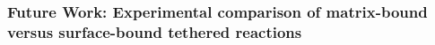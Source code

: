 \documentclass[../../AdvancementSummary.tex]{subfiles}
\begin{document}
%
%


%


\subsubsection{Future Work: Experimental comparison of matrix-bound versus surface-bound tethered reactions}
\end{document}
